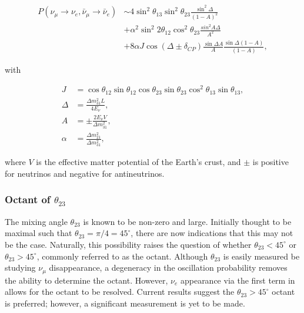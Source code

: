 \begin{align} %
    P(\nu_{\mu}\rightarrow\nu_{e},\bar{\nu}_{\mu}\rightarrow\bar{\nu}_{e})
     & \sim4\sin^{2}\theta_{13}\sin^{2}\theta_{23}\frac{\sin^{2}\Delta}{(1-A)^{2}} \nonumber     \\
     & + \alpha^{2}\sin^{2}2\theta_{12}\cos^{2}\theta_{23}\frac{sin^{2}A\Delta}{A^{2}} \nonumber \\
     & + 8\alpha J\cos(\Delta\pm\delta_{CP})\frac{\sin\Delta A}{A}\frac{\sin\Delta(1-A)}{(1-A)},
    \label{eq:chips_prob}
\end{align}

with

\begin{align} %
    J      & = \cos\theta_{12}\sin\theta_{12}\cos\theta_{23}
    \sin\theta_{23}\cos^{2}\theta_{13}\sin\theta_{13},       \\
    \Delta & = \frac{\Delta m^{2}_{31}L}{4E_{\nu}},          \\
    A      & = \pm\frac{2E_{\nu}V}{\Delta m^{2}_{31}},       \\
    \alpha & = \frac{\Delta m^{2}_{21}}{\Delta m^{2}_{31}},
    \label{eq:chips_prob_parts}
\end{align}

where $V$ is the effective matter potential of the Earth's crust, and $\pm$ is positive for
neutrinos and negative for antineutrinos.

\subsubsection*{Octant of $\theta_{23}$} %

The mixing angle $\theta_{23}$ is known to be non-zero and large. Initially thought to be maximal
such that $\theta_{23}=\pi/4=45^{\circ}$, there are now indications that this may not be the case.
Naturally, this possibility raises the question of whether $\theta_{23}<45^{\circ}$ or
$\theta_{23}>45^{\circ}$, commonly referred to as the octant. Although $\theta_{23}$ is easily
measured be studying $\nu_{\mu}$ disappearance, a degeneracy in the oscillation probability
removes the ability to determine the octant. However, $\nu_{e}$ appearance via the first term in
 allows for the octant to be resolved. Current results suggest the
$\theta_{23}>45^{\circ}$ octant is preferred; however, a significant measurement is yet to be
made.

